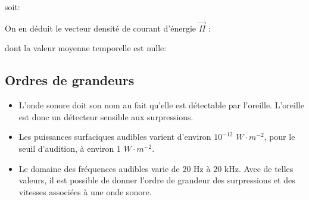 \documentclass[a4paper, 12pt]{article}
\begin{document}
soit:

\begin{center}
\end{center}

On en déduit le vecteur densité de courant d'énergie $\overrightarrow{\Pi}$ : 
\begin{center}
\end{center}

dont la valeur moyenne temporelle est nulle:

\begin{center}
\end{center}

\noindent{}

\subsection{Ordres de grandeurs}

\begin{itemize}
\item L'onde sonore doit son nom au fait qu'elle est détectable par l'oreille. L'oreille est donc un détecteur sensible aux surpressions. 
\item Les puissances surfaciques audibles varient d'environ $10^{-12}$ $W\cdot m^{-2}$, pour le seuil d'audition, à environ $1$ $W\cdot m^{-2}$. 
\item Le domaine des fréquences audibles varie de $20$ Hz à $20$ kHz. Avec de telles valeurs, il est possible de donner l'ordre de grandeur des surpressions et des vitesses associées à une onde sonore.
\end{itemize}
\end{document}
